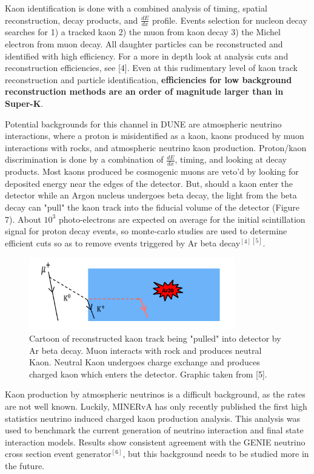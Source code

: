 \documentclass[aps,onecolumn,twoside,secnumarabic,balancelastpage,amsmath,amssymb,nofootinbib,hyperref=pdftex]{revtex4}
\begin{document}
Kaon identification is done with a combined analysis of timing, spatial reconstruction, decay products, and $\frac{dE}{dx}$ profile. Events selection for nucleon decay searches for 1) a tracked kaon 2) the muon from kaon decay 3) the Michel electron from muon decay. All daughter particles can be reconstructed and identified with high efficiency. For a more in depth look at analysis cuts and reconstruction efficiencies, see [4]. Even at this rudimentary level of kaon track reconstruction and particle identification, \textbf{efficiencies for low background reconstruction methods are an order of magnitude larger than in Super-K}.

Potential backgrounds for this channel in DUNE are atmospheric neutrino interactions, where a proton is misidentified as a kaon, kaons produced by muon interactions with rocks, and atmospheric neutrino kaon production. Proton/kaon discrimination is done by a combination of $\frac{dE}{dx}$, timing, and looking at decay products. Most kaons produced be cosmogenic muons are veto'd by looking for deposited energy near the edges of the detector. But, should a kaon enter the detector while an Argon nucleus undergoes beta decay, the light from the beta decay can "pull" the kaon track into the fiducial volume of the detector (Figure 7). About $10^3$ photo-electrons are expected on average for the initial scintillation signal for proton decay events, so monte-carlo studies are used to determine efficient cuts so as to remove events triggered by Ar beta decay$^{[4]}$$^{[5]}$. 

\begin{figure}[htbp]
\begin{center}
\includegraphics[width=9cm]{beta.png}
\caption{Cartoon of reconstructed kaon track being "pulled" into detector by Ar beta decay. Muon interacts with rock and produces neutral Kaon. Neutral Kaon undergoes charge exchange and produces charged kaon which enters the detector. Graphic taken from [5].}
\label{default}
\end{center}
\end{figure}

Kaon production by atmospheric neutrinos is a difficult background, as the rates are not well known. Luckily, MINERvA has only recently published the first high statistics neutrino induced charged kaon production analysis. This analysis was used to benchmark the current generation of neutrino interaction and final state interaction models. Results show consistent agreement with the GENIE neutrino cross section event generator$^{[6]}$, but this background needs to be studied more in the future.
\end{document}
